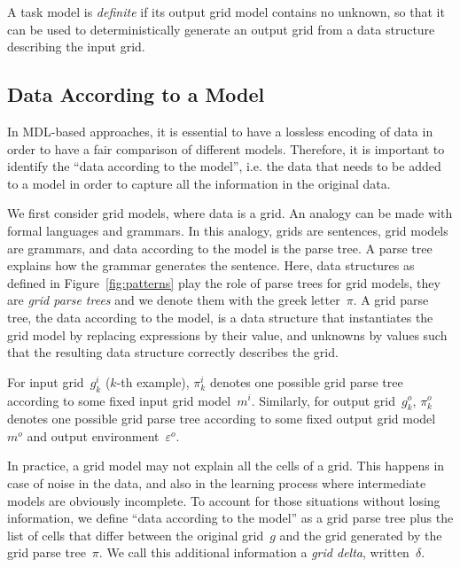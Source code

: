 \documentclass[a4paper]{llncs}
\newcommand{\KILL}[1]{}
\newcommand{\nat}{\mathbb{N}}
\begin{document}
A task model is {\em definite} if its output grid model contains no
unknown, so that it can be used to deterministically generate an
output grid from a data structure describing the input grid.


\subsection{Data According to a Model}
\label{data}

In MDL-based approaches, it is essential to have a lossless encoding
of data in order to have a fair comparison of different
models. Therefore, it is important to identify the ``data according to
the model'', i.e. the data that needs to be added to a model in order
to capture all the information in the original data.

We first consider grid models, where data is a grid. An analogy can be
made with formal languages and grammars. In this analogy, grids are
sentences, grid models are grammars, and data according to the model
is the parse tree. A parse tree explains how the grammar generates
the sentence. Here, data structures as defined in
Figure~\ref{fig:patterns} play the role of parse trees for grid
models, they are {\em grid parse trees} and we denote them with the
greek letter~$\pi$. A grid parse tree, the data according to the
model, is a data structure that instantiates the grid model by
replacing expressions by their value, and unknowns by values such that
the resulting data structure correctly describes the grid.

For input grid~$g^i_k$ ($k$-th example), $\pi^i_k$ denotes one
possible grid parse tree according to some fixed input grid
model~$m^i$. Similarly, for output grid~$g^o_k$, $\pi^o_k$ denotes one
possible grid parse tree according to some fixed output grid
model~$m^o$ and output environment~$\varepsilon^o$.

In practice, a grid model may not explain all the cells of a
grid. This happens in case of noise in the data, and also in the
learning process where intermediate models are obviously
incomplete. To account for those situations without losing
information, we define ``data according to the model'' as a grid parse
tree plus the list of cells that differ between the original grid~$g$
and the grid generated by the grid parse tree~$\pi$. We call this
additional information a {\em grid delta}, written~$\delta$.
\KILL{Formally, a grid
delta is a set of triples~$(i,j,c) \in \nat \times \nat \times C$
stating that the cell at coordinates~$(i,j)$ has color~$c$ in~$g$,
which is different from the color specified by~$\pi$.}
\end{document}
